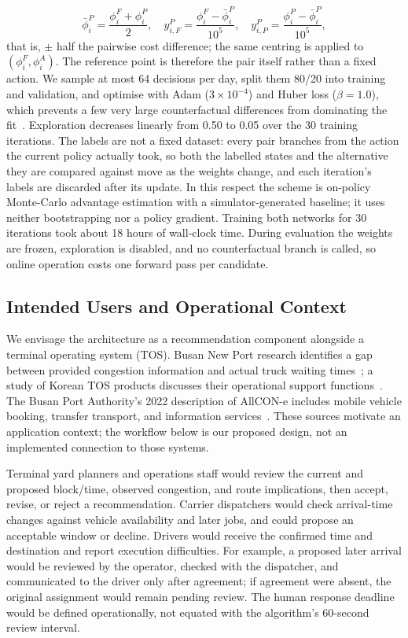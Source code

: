 \documentclass[a4paper]{llncs}
\begin{document}
\begin{equation}
\bar\phi_i^P=\frac{\phi_i^F+\phi_i^P}{2},\quad
y_{i,F}^P=\frac{\phi_i^F-\bar\phi_i^P}{10^5},\quad
y_{i,P}^P=\frac{\phi_i^P-\bar\phi_i^P}{10^5},
\end{equation}
that is, $\pm$ half the pairwise cost difference; the same centring is
applied to $(\phi_i^F,\phi_i^A)$. The reference point is therefore the
pair itself rather than a fixed action.
We sample at most 64 decisions per day, split them 80/20 into training
and validation, and optimise with Adam ($3\times10^{-4}$) and Huber loss
($\beta=1.0$), which prevents a few very large counterfactual
differences from dominating the fit~\cite{refhuber}. Exploration
decreases linearly from 0.50 to 0.05 over the 30 training iterations.
The labels are not a fixed dataset: every pair branches from the action
the current policy actually took, so both the labelled states and the
alternative they are compared against move as the weights change, and
each iteration's labels are discarded after its update. In this respect
the scheme is on-policy Monte-Carlo advantage estimation with a
simulator-generated baseline; it uses neither bootstrapping nor a policy
gradient. Training both networks for 30 iterations took about 18 hours
of wall-clock time. During evaluation the weights are frozen,
exploration is disabled, and no counterfactual branch is called, so
online operation costs one forward pass per candidate.

\subsection{Intended Users and Operational Context}
\label{sec:user-context}
We envisage the architecture as a recommendation component alongside a
terminal operating system (TOS). Busan New Port research identifies a gap
between provided congestion information and actual truck waiting
times~\cite{refbusanwait}; a study of Korean TOS products discusses their
operational support functions~\cite{reftos}. The Busan Port Authority's
2022 description of AllCON-e includes mobile vehicle booking, transfer
transport, and information services~\cite{refallcone}. These sources
motivate an application context; the workflow below is our proposed
design, not an implemented connection to those systems.

Terminal yard planners and operations staff would review the current
and proposed block/time, observed congestion, and route implications,
then accept, revise, or reject a recommendation. Carrier dispatchers
would check arrival-time changes against vehicle availability and later
jobs, and could propose an acceptable window or decline. Drivers would
receive the confirmed time and destination and report execution
difficulties. For example, a proposed later arrival would be reviewed
by the operator, checked with the dispatcher, and communicated to the
driver only after agreement; if agreement were absent, the original
assignment would remain pending review. The human response deadline
would be defined operationally, not equated with the algorithm's
60-second review interval.
\end{document}
